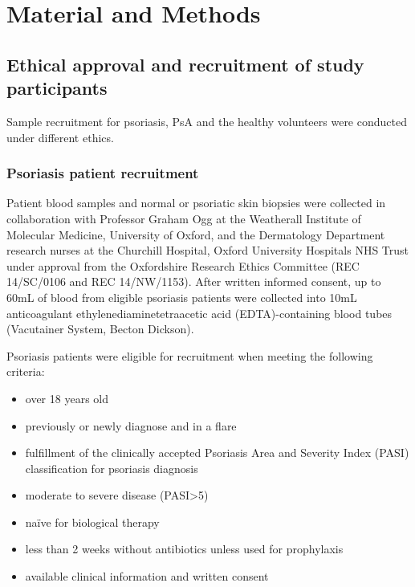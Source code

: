 \chapter{Material and Methods}
\label{ch:Mat}



\section{Ethical approval and recruitment of study participants}
Sample recruitment for psoriasis, PsA and the healthy volunteers were conducted under different ethics.


\subsection{Psoriasis patient recruitment}

Patient blood samples and normal or psoriatic skin biopsies were collected in collaboration with Professor Graham Ogg at the Weatherall Institute of Molecular Medicine, University of Oxford, and the Dermatology Department research nurses at the Churchill Hospital, Oxford University Hospitals NHS Trust under approval from the Oxfordshire Research Ethics Committee (REC 14/SC/0106 and REC 14/NW/1153). After written informed consent, up to 60mL of blood from eligible psoriasis patients were collected into 10mL anticoagulant ethylenediaminetetraacetic acid (EDTA)-containing blood tubes (Vacutainer System, Becton Dickson).

Psoriasis patients were eligible for recruitment when meeting the following criteria:

\begin{itemize}
  \item over 18 years old
  \item previously or newly diagnose and in a flare %
	\item fulfillment of the clinically accepted Psoriasis Area and Severity Index (PASI) classification for psoriasis diagnosis \parencite{Fredriksson1978}
	\item moderate to severe disease (PASI>5) %
	\item na\"{i}ve for biological therapy
	\item less than 2 weeks without antibiotics unless used for prophylaxis %
	\item available clinical information and written consent
\end{itemize}

